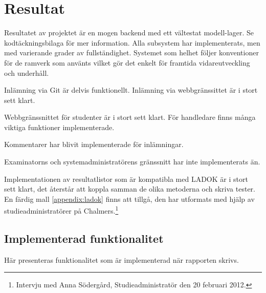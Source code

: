 \section{Resultat}
Resultatet av projektet är en mogen backend med ett vältestat modell-lager. Se kodtäckningsbilaga för mer information. Alla subsystem har implementerats, men med varierande grader av fullständighet. Systemet som helhet följer konventioner för de ramverk som använts vilket gör det enkelt för framtida vidareutveckling och underhåll.

Inlämning via Git är delvis funktionellt. Inlämning via webbgränssittet är i stort sett klart.

Webbgränssnittet för studenter är i stort sett klart. För handledare finns många viktiga funktioner implementerade.

Kommentarer har blivit implementerade för inlämningar.

Examinatorns och systemadministratörens gränssnitt har inte implementerats än.

Implementationen av resultatlistor som är kompatibla med LADOK är i stort sett klart, det återstår att koppla samman de olika metoderna och skriva tester. En färdig mall \ref{appendix:ladok} finns att tillgå, den har utformats med hjälp av studieadministratörer på Chalmers.\footnote{Intervju med Anna Södergård, Studieadministratör den 20 februari 2012.}

\subsection{Implementerad funktionalitet}
Här presenteras funktionalitet som är implementerad när rapporten skrivs.

